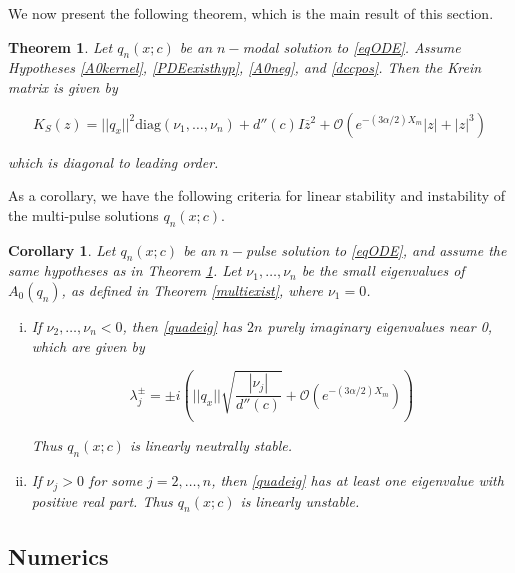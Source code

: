 \documentclass[12pt]{article}
\newtheorem{theorem}{Theorem}
\newtheorem{corollary}{Corollary}
\begin{document}
We now present the following theorem, which is the main result of this section.

\begin{theorem}\label{Kreindiag}
Let $q_n(x; c)$ be an $n-$modal solution to \eqref{eqODE}. Assume Hypotheses \ref{A0kernel}, \ref{PDEexisthyp}, \ref{A0neg}, and \ref{dccpos}. Then the Krein matrix is given by

\begin{equation}\label{Kreinapprox}
K_S(z) = ||q_x||^2 \text{diag} (\nu_1, \dots, \nu_n)
 + d''(c) I \overline{z}^2 + \mathcal{O}(e^{-(3 \alpha/2) X_m}|z| + |z|^3)
\end{equation}

which is diagonal to leading order.

\end{theorem}

As a corollary, we have the following criteria for linear stability and instability of the multi-pulse solutions $q_n(x; c)$.

\begin{corollary}\label{stabcrit}
Let $q_n(x; c)$ be an $n-$pulse solution to \eqref{eqODE}, and assume the same hypotheses as in Theorem \ref{Kreindiag}. Let $\nu_1, \dots, \nu_n$ be the small eigenvalues of $A_0(q_n)$, as defined in Theorem \ref{multiexist}, where $\nu_1 = 0$.
\begin{enumerate}[(i)]
	\item If $\nu_2, \dots, \nu_n < 0$, then \eqref{quadeig} has $2n$ purely imaginary eigenvalues near 0, which are given by

	\begin{equation}\label{npulseKreineigs}
	\lambda_j^\pm = \pm i \left( ||q_x|| \sqrt{ \frac{|\nu_j|}{d''(c)} } + \mathcal{O}(e^{-(3 \alpha/2) X_m}) \right)
	\end{equation}

	Thus $q_n(x; c)$ is linearly neutrally stable.

	\item If $\nu_j > 0$ for some $j = 2, \dots, n$, then \eqref{quadeig} has at least one eigenvalue with positive real part. Thus $q_n(x; c)$ is linearly unstable.
\end{enumerate}

\end{corollary}

\subsection{Numerics}
\end{document}
